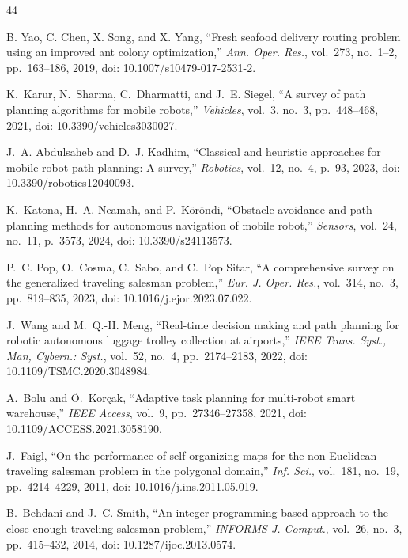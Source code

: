\documentclass[lettersize,journal]{IEEEtran}
\begin{document}
\begin{thebibliography}{44}

B. Yao, C. Chen, X. Song, and X. Yang, ``Fresh seafood delivery routing problem using an improved ant colony optimization,'' \textit{Ann. Oper. Res.}, vol.~273, no.~1--2, pp.~163--186, 2019, doi: 10.1007/s10479-017-2531-2.


K.~Karur, N.~Sharma, C.~Dharmatti, and J.~E. Siegel, ``A survey of path planning algorithms for mobile robots,'' \textit{Vehicles}, vol.~3, no.~3, pp.~448--468, 2021, doi: 10.3390/vehicles3030027.


J.~A. Abdulsaheb and D.~J. Kadhim, ``Classical and heuristic approaches for mobile robot path planning: A survey,'' \textit{Robotics}, vol.~12, no.~4, p.~93, 2023, doi: 10.3390/robotics12040093.


K.~Katona, H.~A. Neamah, and P.~K\"or\"ondi, ``Obstacle avoidance and path planning methods for autonomous navigation of mobile robot,'' \textit{Sensors}, vol.~24, no.~11, p.~3573, 2024, doi: 10.3390/s24113573.


P.~C. Pop, O.~Cosma, C.~Sabo, and C.~Pop Sitar, ``A comprehensive survey on the generalized traveling salesman problem,'' \textit{Eur. J. Oper. Res.}, vol.~314, no.~3, pp.~819--835, 2023, doi: 10.1016/j.ejor.2023.07.022.


J.~Wang and M.~Q.-H. Meng, ``Real-time decision making and path planning for robotic autonomous luggage trolley collection at airports,'' \textit{IEEE Trans. Syst., Man, Cybern.: Syst.}, vol.~52, no.~4, pp.~2174--2183, 2022, doi: 10.1109/TSMC.2020.3048984.


A.~Bolu and \"O.~Kor\c{c}ak, ``Adaptive task planning for multi-robot smart warehouse,'' \textit{IEEE Access}, vol.~9, pp.~27346--27358, 2021, doi: 10.1109/ACCESS.2021.3058190.


J.~Faigl, ``On the performance of self-organizing maps for the non-Euclidean traveling salesman problem in the polygonal domain,'' \textit{Inf. Sci.}, vol.~181, no.~19, pp.~4214--4229, 2011, doi: 10.1016/j.ins.2011.05.019.


B.~Behdani and J.~C. Smith, ``An integer-programming-based approach to the close-enough traveling salesman problem,'' \textit{INFORMS J. Comput.}, vol.~26, no.~3, pp.~415--432, 2014, doi: 10.1287/ijoc.2013.0574.


\end{thebibliography}
\end{document}
